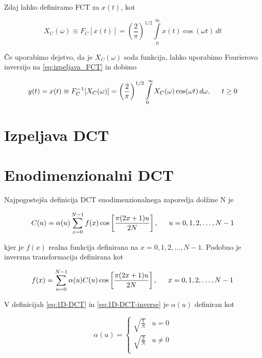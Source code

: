 \documentclass[a4paper,12pt,openright]{book}
\begin{document}
Zdaj lahko definiramo FCT za $x(t)$, kot

\begin{equation}
X_C(\omega) \equiv F_C[x(t)]= \left( \frac{2}{\pi} \right)^{1/2} 
                          \int\limits_{0}^{\infty} x(t)  \cos(\omega t) \,dt
\label{eq:FCT}
\end{equation}

Če uporabimo dejstvo, da je $X_C(\omega)$ soda funkcija, lahko uporabimo Fourierovo inverzijo na \ref{eq:izpeljava_FCT} in dobimo

\begin{equation}
y(t) = x(t) \equiv F_C^{-1}[X_C(\omega)]= \left( \frac{2}{\pi} \right)^{1/2} 
            \int\limits_{0}^{\infty} X_C(\omega)  \cos(\omega t) \,d\omega, \indent t \geq 0
\label{eq:Inverzni_FCT}
\end{equation}


\section{Izpeljava DCT}


\section{Enodimenzionalni DCT}%
Najpogostejša definicija DCT enodimenzionalnega zaporedja dolžine N je %

\begin{equation}
C(u) = \alpha(u)  \sum_{x=0}^{N-1} f(x)\cos\left[\frac{\pi(2x+1)u}{2N}\right],  \indent 
u = 0,1,2,\ldots,N-1
\label{eq:1D-DCT}
\end{equation}

kjer je $f(x)$ realna funkcija definirana na $x = 0,1,2,\ldots,N-1$.
Podobno je inverzna transformacija definirana kot 

\begin{equation}
f(x) = \sum_{u=0}^{N-1} \alpha(u)C(u)\cos\left[\frac{\pi(2x+1)u}{2N}\right],  \indent 
x = 0,1,2,\ldots,N-1
\label{eq:1D-DCT-inverse}
\end{equation}

V definicijah \ref{eq:1D-DCT} in \ref{eq:1D-DCT-inverse} je $\alpha(u)$ definiran kot 

\begin{equation}
\alpha(u)=
    \begin{cases}
          \sqrt{\frac{1}{N}} & u=0 \\
          \sqrt{\frac{2}{N}} & u\neq 0 \\
    \end{cases}
\label{eq:definicija_alpha}
\end{equation}
\end{document}
